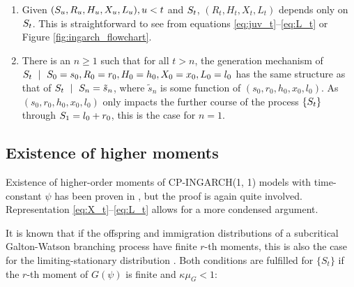 \documentclass[review]{elsarticle}
\begin{document}
\begin{enumerate}
\item Given $(S_u, R_u, H_u, X_u, L_u), u < t$ and $S_t$, $(R_t, H_t, X_t, L_t)$ depends only on $S_t$. This is straightforward to see from equations \eqref{eq:juv_t}--\eqref{eq:L_t} or Figure \ref{fig:ingarch_flowchart}.
\item There is an $n \geq 1$ such that for all $t > n$, the generation mechanism of $\juv_t \ \mid \ \juv_0 = s_0, R_0 = r_0, H_0 = h_0, X_0 = x_0, L_0 = l_0$ has the same structure as that of $\juv_t \ \mid \ \juv_n = \tilde{s}_n$, where $\tilde{s}_n$ is some function of $(s_0, r_0, h_0, x_0, l_0)$. As $(s_0, r_0, h_0, x_0, l_0)$ only impacts the further course of the process $\{S_t\}$ through $S_1 = l_0 + r_0$, this is the case for $n = 1$. %
\end{enumerate}

\subsection{Existence of higher moments}

Existence of higher-order moments of CP-INGARCH(1, 1) models with time-constant $\psi$ has been proven in \cite{Silva2016}, but the proof is again quite involved. Representation \eqref{eq:X_t}--\eqref{eq:L_t} allows for a more condensed argument.

It is known that if the offspring and immigration distributions of a subcritical Galton-Watson branching process have finite $r$-th moments, this is also the case for the limiting-stationary distribution \cite[Sec. 4]{Lange1981}. Both conditions are fulfilled for $\{S_t\}$ if the $r$-th moment of $G(\psi)$ is finite and $\kappa\mu_G < 1$:
\end{document}
